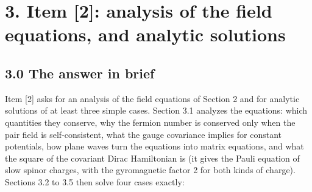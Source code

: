 \documentclass[
  10pt,
]{article}
\begin{document}
\hypertarget{item-2-analysis-of-the-field-equations-and-analytic-solutions}{%
\section{3. Item {[}2{]}: analysis of the field equations, and analytic
solutions}\label{item-2-analysis-of-the-field-equations-and-analytic-solutions}}

\hypertarget{the-answer-in-brief-1}{%
\subsection{3.0 The answer in brief}\label{the-answer-in-brief-1}}

Item {[}2{]} asks for an analysis of the field equations of Section 2
and for analytic solutions of at least three simple cases. Section 3.1
analyzes the equations: which quantities they conserve, why the fermion
number is conserved only when the pair field is self-consistent, what
the gauge covariance implies for constant potentials, how plane waves
turn the equations into matrix equations, and what the square of the
covariant Dirac Hamiltonian is (it gives the Pauli equation of slow
spinor charges, with the gyromagnetic factor 2 for both kinds of
charge). Sections 3.2 to 3.5 then solve four cases exactly:
\end{document}
